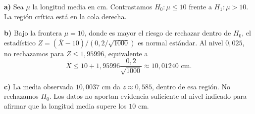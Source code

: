 \textbf{a)} Sea $\mu$ la longitud media en cm. Contrastamos $H_0:\mu\le10$ frente a $H_1:\mu>10$. La región crítica está en la cola derecha.

\textbf{b)} Bajo la frontera $\mu=10$, donde es mayor el riesgo de rechazar dentro de $H_0$, el estadístico $Z=(\bar X-10)/(0{,}2/\sqrt{1000})$ es normal estándar. Al nivel $0{,}025$, no rechazamos para $Z\le1{,}95996$, equivalente a
\[
\bar X\le 10+1{,}95996\frac{0{,}2}{\sqrt{1000}}\approx10{,}01240\text{ cm}.
\]

\textbf{c)} La media observada $10{,}0037$ cm da $z\approx0{,}585$, dentro de esa región. No rechazamos $H_0$. Los datos no aportan evidencia suficiente al nivel indicado para afirmar que la longitud media supere los $10$ cm.
